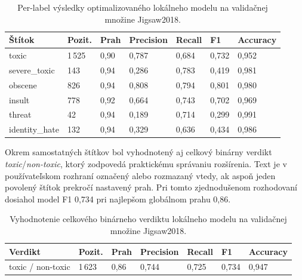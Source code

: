 \FloatBarrier
\begin{table}[!htbp]
  \centering
  \small
  \setlength{\tabcolsep}{4pt}
  \begin{tabularx}{\textwidth}{|P{2.6cm}|Y|Y|Y|Y|Y|Y|}
    \hline
    \textbf{Štítok} &
    \textbf{Pozit.} &
    \textbf{Prah} &
    \textbf{Precision} &
    \textbf{Recall} &
    \textbf{F1} &
    \textbf{Accuracy} \\
    \hline
    toxic & 1\,525 & 0{,}90 & 0{,}787 & 0{,}684 & 0{,}732 & 0{,}952 \\
    \hline
    severe\_toxic & 143 & 0{,}94 & 0{,}286 & 0{,}783 & 0{,}419 & 0{,}981 \\
    \hline
    obscene & 826 & 0{,}94 & 0{,}808 & 0{,}794 & 0{,}801 & 0{,}980 \\
    \hline
    insult & 778 & 0{,}92 & 0{,}664 & 0{,}743 & 0{,}702 & 0{,}969 \\
    \hline
    threat & 42 & 0{,}94 & 0{,}189 & 0{,}714 & 0{,}299 & 0{,}991 \\
    \hline
    identity\_hate & 132 & 0{,}94 & 0{,}329 & 0{,}636 & 0{,}434 & 0{,}986 \\
    \hline
  \end{tabularx}
  \caption[Per-label výsledky lokálneho Char-CNN modelu]{Per-label výsledky optimalizovaného lokálneho modelu na validačnej množine Jigsaw2018.}
  \label{tab:local_charcnn_perlabel}
\end{table}
\FloatBarrier

Okrem samostatných štítkov bol vyhodnotený aj celkový binárny verdikt \emph{toxic}/\emph{non-toxic}, ktorý zodpovedá praktickému správaniu rozšírenia. Text je v používateľskom rozhraní označený alebo rozmazaný vtedy, ak aspoň jeden povolený štítok prekročí nastavený prah. Pri tomto zjednodušenom rozhodovaní dosiahol model F1 0{,}734 pri najlepšom globálnom prahu 0{,}86.

\FloatBarrier
\begin{table}[!htbp]
  \centering
  \small
  \setlength{\tabcolsep}{4pt}
  \begin{tabularx}{\textwidth}{|P{2.8cm}|Y|Y|Y|Y|Y|Y|}
    \hline
    \textbf{Verdikt} &
    \textbf{Pozit.} &
    \textbf{Prah} &
    \textbf{Precision} &
    \textbf{Recall} &
    \textbf{F1} &
    \textbf{Accuracy} \\
    \hline
    toxic / non-toxic & 1\,623 & 0{,}86 & 0{,}744 & 0{,}725 & 0{,}734 & 0{,}947 \\
    \hline
  \end{tabularx}
  \caption[Celkový toxický verdikt lokálneho modelu]{Vyhodnotenie celkového binárneho verdiktu lokálneho modelu na validačnej množine Jigsaw2018.}
  \label{tab:local_charcnn_overall}
\end{table}
\FloatBarrier

